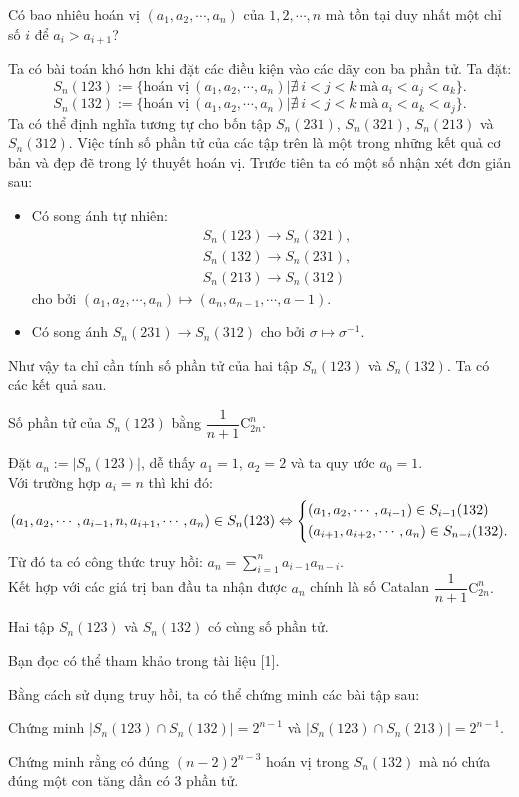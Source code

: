 \begin{bt}
	Có bao nhiêu hoán vị $(a_1,a_2,\cdots,a_n)$ của $1,2,\cdots,n$ mà tồn tại duy nhất một chỉ số $i$ để $a_i>a_{i+1}$?
\end{bt}
Ta có bài toán khó hơn khi đặt các điều kiện vào các dãy con ba phần tử. Ta đặt:
$$S_n(123):=\{\text{hoán vị}\  (a_1,a_2,\cdots,a_n) |\nexists\ i<j<k\ \text{mà}\ a_i<a_j<a_k\}.$$
$$S_n(132):=\{\text{hoán vị}\  (a_1,a_2,\cdots,a_n) |\nexists\ i<j<k\ \text{mà}\ a_i<a_k<a_j\}.$$
Ta có thể định nghĩa tương tự cho bốn tập $S_n(231)$, $S_n(321)$, $S_n(213)$ và $S_n(312)$. Việc tính số phần tử của các tập trên là một trong những kết quả cơ bản và đẹp đẽ trong lý thuyết hoán vị. Trước tiên ta có một số nhận xét đơn giản sau:
\begin{itemize}
	\item Có song ánh tự nhiên: 
	\begin{align*}
		&S_n(123)\rightarrow S_n(321),\\
		&S_n(132)\rightarrow S_n(231),\\
		&S_n(213)\rightarrow S_n(312)
	\end{align*}
	cho bởi $(a_1,a_2,\cdots,a_n)\mapsto (a_n,a_{n-1},\cdots,a-1)$.
	\item Có song ánh $S_n(231)\rightarrow S_n(312)$ cho bởi $\sigma\mapsto\sigma^{-1}$. 
\end{itemize}
Như vậy ta chỉ cần tính số phần tử của hai tập $S_n(123)$ và $S_n(132)$. Ta có các kết quả sau.
\begin{dl}
	Số phần tử của $S_n(123)$ bằng $\dfrac{1}{n+1}\mathrm{C}^n_{2n}$.
	\begin{cm}
		Đặt $a_n:=|S_n(123)|$, dễ thấy $a_1=1$, $a_2=2$ và ta quy ước $a_0=1$.\\
		Với trường hợp $a_i=n$ thì khi đó:
		$$(a_1,a_2,\cdots,a_{i-1},n,a_{i+1},\cdots,a_n)\in S_n(123)\Leftrightarrow \left\{\begin{aligned}&(a_1,a_2,\cdots,a_{i-1})\in S_{i-1}(132)\\ &(a_{i+1},a_{i+2},\cdots,a_n)\in S_{n-i}(132).\end{aligned}\right.$$
		Từ đó ta có công thức truy hồi: $a_n=\sum\limits_{i=1}^{n}a_{i-1}a_{n-i}$.\\
		Kết hợp với các giá trị ban đầu ta nhận được $a_n$ chính là số Catalan $\dfrac{1}{n+1}\mathrm{C}_{2n}^n.$ 
	\end{cm}
\end{dl}
\begin{dl}
	Hai tập $S_n(123)$ và $S_n(132)$ có cùng số phần tử.
	\begin{cm}
		Bạn đọc có thể tham khảo trong tài liệu [1]. 
	\end{cm}
\end{dl}
Bằng cách sử dụng truy hồi, ta có thể chứng minh các bài tập sau:
\begin{bt}
	Chứng minh $|S_n(123)\cap S_n(132)|=2^{n-1}$ và $|S_n(123)\cap S_n(213)|=2^{n-1}$.
\end{bt}
\begin{bt}
	Chứng minh rằng có đúng $(n-2)2^{n-3}$ hoán vị trong $S_n(132)$ mà nó chứa đúng một con tăng dần có 3 phần tử.
\end{bt}

